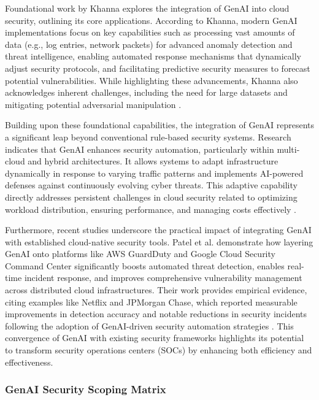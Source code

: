 Foundational work by Khanna \cite{khanna_enhancing_2024} explores the integration of GenAI into cloud security, outlining its core applications. According to Khanna, modern GenAI implementations focus on key capabilities such as processing vast amounts of data (e.g., log entries, network packets) for advanced anomaly detection and threat intelligence, enabling automated response mechanisms that dynamically adjust security protocols, and facilitating predictive security measures to forecast potential vulnerabilities. While highlighting these advancements, Khanna also acknowledges inherent challenges, including the need for large datasets and mitigating potential adversarial manipulation \cite{khanna_enhancing_2024}.

Building upon these foundational capabilities, the integration of GenAI represents a significant leap beyond conventional rule-based security systems. Research indicates that GenAI enhances security automation, particularly within multi-cloud and hybrid architectures. It allows systems to adapt infrastructure dynamically in response to varying traffic patterns and implements AI-powered defenses against continuously evolving cyber threats. This adaptive capability directly addresses persistent challenges in cloud security related to optimizing workload distribution, ensuring performance, and managing costs effectively \cite{seth_ai_2025}.

Furthermore, recent studies underscore the practical impact of integrating GenAI with established cloud-native security tools. Patel et al. \cite{patel_generative_2025} demonstrate how layering GenAI onto platforms like AWS GuardDuty and Google Cloud Security Command Center significantly boosts automated threat detection, enables real-time incident response, and improves comprehensive vulnerability management across distributed cloud infrastructures. Their work provides empirical evidence, citing examples like Netflix and JPMorgan Chase, which reported measurable improvements in detection accuracy and notable reductions in security incidents following the adoption of GenAI-driven security automation strategies \cite{patel_generative_2025}. This convergence of GenAI with existing security frameworks highlights its potential to transform security operations centers (SOCs) by enhancing both efficiency and effectiveness.

\subsubsection{GenAI Security Scoping Matrix} %
\label{sec: GenAI Security Scoping Matrix}

